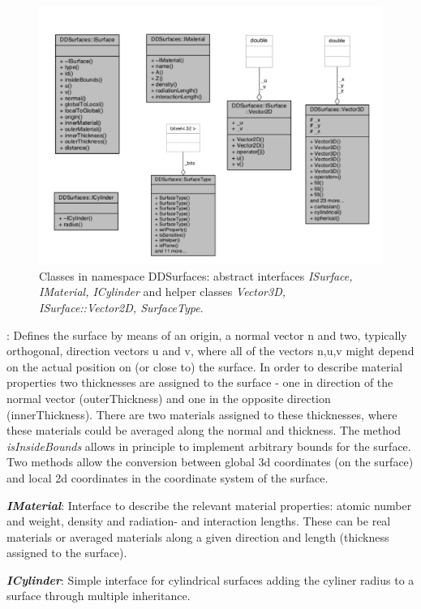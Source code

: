 \documentclass[10pt,a4paper]{article}
\begin{document}
\begin{figure}[h]
  \begin{center}
    \includegraphics[width=120mm] {DDRec_ISurface_classes.png}
    \caption{Classes in namespace DDSurfaces: abstract interfaces {\em ISurface, IMaterial, ICylinder}
      and helper classes {\em Vector3D, ISurface::Vector2D, SurfaceType}. }
    \label{fig:ddrec_ddsurfaces_classes}
  \end{center}
\end{figure}

: Defines the surface by means of an origin, a normal vector n and two, 
typically orthogonal, direction vectors u and v, where all of the vectors n,u,v might depend 
on the actual position on (or close to) the surface. In order to describe material properties
two thicknesses are assigned to the surface - one in direction of the normal vector (outerThickness) 
and one in the opposite direction (innerThickness). There are two materials assigned to these
thicknesses, where these materials could be averaged along the normal and thickness.
The method {\em isInsideBounds} allows in principle to implement arbitrary bounds for the surface.
Two methods allow the conversion between global 3d coordinates (on the surface) and local 2d coordinates 
in the coordinate system of the surface.
 
\noindent
{\em \bf IMaterial}: Interface to describe the relevant material properties: atomic number and weight, 
density and radiation- and interaction lengths. These can be real materials or averaged materials along
a given direction and length (thickness assigned to the surface).

\noindent
{\em \bf ICylinder}: Simple interface for cylindrical surfaces adding the cyliner radius to a surface
through multiple inheritance.
\end{document}
